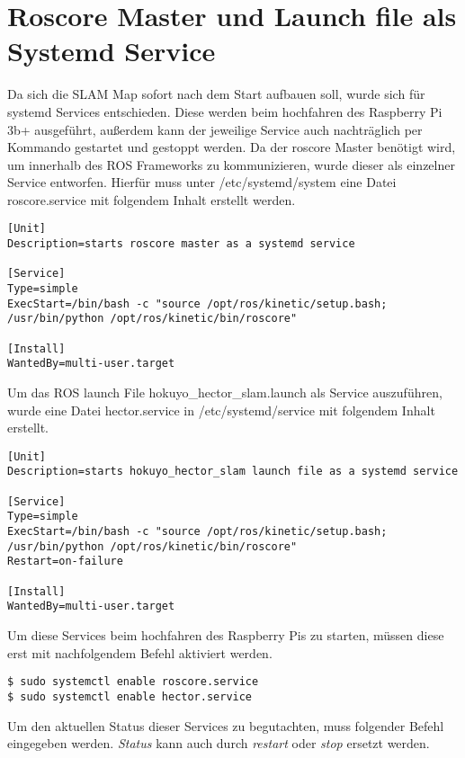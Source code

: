 \section{Roscore Master und Launch file als Systemd Service}
Da sich die SLAM Map sofort nach dem Start aufbauen soll, wurde sich für systemd Services entschieden. Diese werden beim hochfahren des Raspberry Pi 3b+ ausgeführt, außerdem kann der jeweilige Service auch nachträglich per Kommando gestartet und gestoppt werden. 
Da der roscore Master benötigt wird, um innerhalb des ROS Frameworks zu kommunizieren, wurde dieser als einzelner Service entworfen. Hierfür muss unter /etc/systemd/system eine Datei roscore.service mit folgendem Inhalt erstellt werden.\\


\begin{lstlisting}
[Unit]
Description=starts roscore master as a systemd service

[Service]
Type=simple
ExecStart=/bin/bash -c "source /opt/ros/kinetic/setup.bash; /usr/bin/python /opt/ros/kinetic/bin/roscore"

[Install]
WantedBy=multi-user.target
\end{lstlisting}

\vspace{-0.9cm}
Um das ROS launch File hokuyo\_hector\_slam.launch als Service auszuführen, wurde eine Datei hector.service in /etc/systemd/service mit folgendem Inhalt erstellt.\\

\begin{lstlisting}
[Unit]
Description=starts hokuyo_hector_slam launch file as a systemd service

[Service]
Type=simple
ExecStart=/bin/bash -c "source /opt/ros/kinetic/setup.bash; /usr/bin/python /opt/ros/kinetic/bin/roscore"
Restart=on-failure

[Install]
WantedBy=multi-user.target
\end{lstlisting}

Um diese Services beim hochfahren des Raspberry Pis zu starten, müssen diese erst mit nachfolgendem Befehl aktiviert werden.\\

\begin{lstlisting}
$ sudo systemctl enable roscore.service
$ sudo systemctl enable hector.service
\end{lstlisting}

Um den aktuellen Status dieser Services zu begutachten, muss folgender Befehl eingegeben werden. \textit{Status} kann auch durch \textit{restart} oder \textit{stop} ersetzt werden.\\ 

